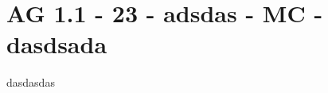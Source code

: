 \section{AG 1.1 - 23 - adsdas - MC - dasdsada}

\begin{beispiel}[AG 1.1]{1}
dasdasdas
\end{beispiel}